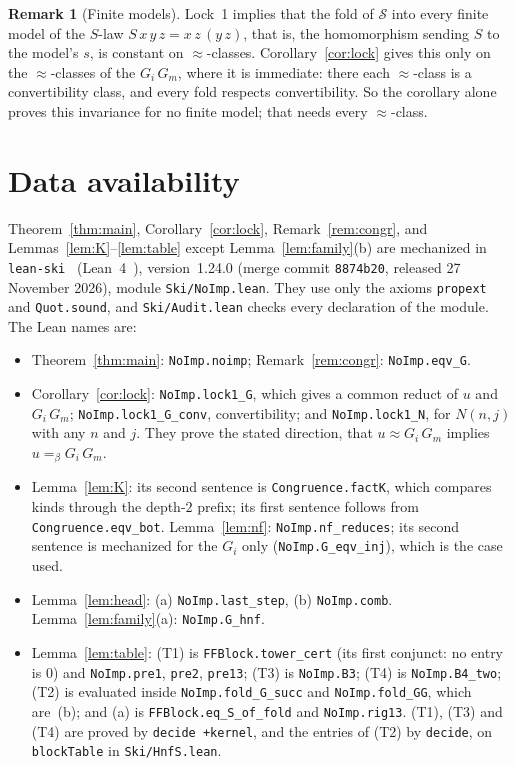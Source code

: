 \documentclass[11pt]{amsart}
\theoremstyle{definition}
\newtheorem{remark}[theorem]{Remark}
\newcommand{\Ter}{\mathcal S}
\newcommand{\conv}{=_\beta}
\begin{document}
\begin{remark}[Finite models]
Lock~1 implies that the fold of $\Ter$ into every finite model of the $S$-law
$S\,x\,y\,z=x\,z\,(y\,z)$, that is, the homomorphism sending $S$ to the model's $s$, is constant on
$\approx$-classes. Corollary~\ref{cor:lock} gives this only on the $\approx$-classes of the
$G_i\,G_m$, where it is immediate: there each $\approx$-class is a convertibility class, and every
fold respects convertibility. So the corollary alone proves this invariance for no finite model;
that needs every $\approx$-class.
\end{remark}

\section*{Data availability}
\sloppy
Theorem~\ref{thm:main}, Corollary~\ref{cor:lock}, Remark~\ref{rem:congr}, and
Lemmas~\ref{lem:K}--\ref{lem:table} except Lemma~\ref{lem:family}(b) are mechanized in
\texttt{lean-ski}~\citep{leanski} (Lean~4~\citep{lean4}), version~1.24.0 (merge commit
\texttt{8874b20}, released 27 November 2026), module \texttt{Ski/NoImp.lean}. They use only the
axioms \texttt{propext} and \texttt{Quot.sound}, and \texttt{Ski/Audit.lean} checks every
declaration of the module. The Lean names are:
\begin{itemize}
\item Theorem~\ref{thm:main}: \texttt{NoImp.noimp}; Remark~\ref{rem:congr}: \texttt{NoImp.eqv\_G}.
\item Corollary~\ref{cor:lock}: \texttt{NoImp.lock1\_G}, which gives a common reduct of $u$ and
  $G_i\,G_m$; \texttt{NoImp.lock1\_G\_conv}, convertibility; and \texttt{NoImp.lock1\_N}, for
  $N(n,j)$ with any $n$ and $j$. They prove the stated direction, that $u\approx G_i\,G_m$ implies
  $u\conv G_i\,G_m$.
\item Lemma~\ref{lem:K}: its second sentence is \texttt{Congruence.factK}, which compares kinds
  through the depth-$2$ prefix; its first sentence follows from \texttt{Congruence.eqv\_bot}.
  Lemma~\ref{lem:nf}: \texttt{NoImp.nf\_reduces}; its second sentence is mechanized for the $G_i$
  only (\texttt{NoImp.G\_eqv\_inj}), which is the case used.
\item Lemma~\ref{lem:head}: (a) \texttt{NoImp.last\_step}, (b) \texttt{NoImp.comb}.
  Lemma~\ref{lem:family}(a): \texttt{NoImp.G\_hnf}.
\item Lemma~\ref{lem:table}: (T1) is \texttt{FFBlock.tower\_cert} (its first conjunct: no entry is
  $0$) and \texttt{NoImp.pre1}, \texttt{pre2}, \texttt{pre13}; (T3) is \texttt{NoImp.B3}; (T4) is
  \texttt{NoImp.B4\_two}; (T2) is evaluated inside \texttt{NoImp.fold\_G\_succ} and
  \texttt{NoImp.fold\_GG}, which are~(b); and (a) is \texttt{FFBlock.eq\_S\_of\_fold} and
  \texttt{NoImp.rig13}. (T1), (T3) and (T4) are proved by \texttt{decide +kernel}, and the entries
  of (T2) by \texttt{decide}, on \texttt{blockTable} in \texttt{Ski/HnfS.lean}.
\end{itemize}
\end{document}
